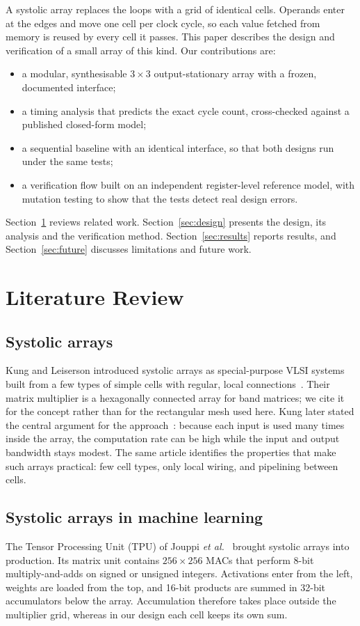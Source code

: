 \documentclass[conference]{IEEEtran}
\begin{document}
A systolic array replaces the loops with a grid of identical cells. Operands enter at the edges and move one cell per clock cycle, so each value fetched from memory is reused by every cell it passes. This paper describes the design and verification of a small array of this kind. Our contributions are:
\begin{itemize}
\item a modular, synthesisable $3 \times 3$ output-stationary array with a frozen, documented interface;
\item a timing analysis that predicts the exact cycle count, cross-checked against a published closed-form model;
\item a sequential baseline with an identical interface, so that both designs run under the same tests;
\item a verification flow built on an independent register-level reference model, with mutation testing to show that the tests detect real design errors.
\end{itemize}

Section~\ref{sec:lit} reviews related work. Section~\ref{sec:design} presents the design, its analysis and the verification method. Section~\ref{sec:results} reports results, and Section~\ref{sec:future} discusses limitations and future work.

\section{Literature Review}
\label{sec:lit}

\subsection{Systolic arrays}
Kung and Leiserson introduced systolic arrays as special-purpose VLSI systems built from a few types of simple cells with regular, local connections~\cite{kung1978}. Their matrix multiplier is a hexagonally connected array for band matrices; we cite it for the concept rather than for the rectangular mesh used here. Kung later stated the central argument for the approach~\cite{kung1982}: because each input is used many times inside the array, the computation rate can be high while the input and output bandwidth stays modest. The same article identifies the properties that make such arrays practical: few cell types, only local wiring, and pipelining between cells.

\subsection{Systolic arrays in machine learning}
The Tensor Processing Unit (TPU) of Jouppi \emph{et al.}~\cite{jouppi2017} brought systolic arrays into production. Its matrix unit contains $256 \times 256$ MACs that perform 8-bit multiply-and-adds on signed or unsigned integers. Activations enter from the left, weights are loaded from the top, and 16-bit products are summed in 32-bit accumulators below the array. Accumulation therefore takes place outside the multiplier grid, whereas in our design each cell keeps its own sum.
\end{document}
